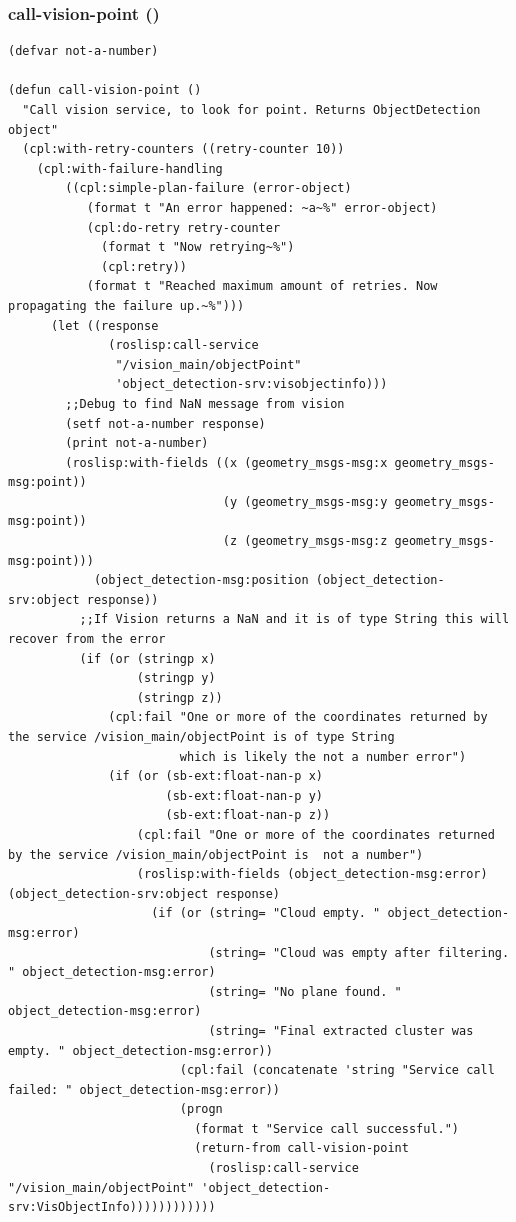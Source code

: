 \documentclass{suturo}
\begin{document}
\noindent
\begin{minipage}{\linewidth}
\subsubsection{call-vision-point ()}
\begin{lstlisting}
(defvar not-a-number)

(defun call-vision-point ()
  "Call vision service, to look for point. Returns ObjectDetection object"
  (cpl:with-retry-counters ((retry-counter 10))
    (cpl:with-failure-handling
        ((cpl:simple-plan-failure (error-object)
           (format t "An error happened: ~a~%" error-object)
           (cpl:do-retry retry-counter
             (format t "Now retrying~%")
             (cpl:retry))
           (format t "Reached maximum amount of retries. Now propagating the failure up.~%")))
      (let ((response
              (roslisp:call-service
               "/vision_main/objectPoint"
               'object_detection-srv:visobjectinfo)))
        ;;Debug to find NaN message from vision
        (setf not-a-number response)
        (print not-a-number)
        (roslisp:with-fields ((x (geometry_msgs-msg:x geometry_msgs-msg:point)) 
                              (y (geometry_msgs-msg:y geometry_msgs-msg:point))
                              (z (geometry_msgs-msg:z geometry_msgs-msg:point)))
            (object_detection-msg:position (object_detection-srv:object response))
          ;;If Vision returns a NaN and it is of type String this will recover from the error
          (if (or (stringp x)
                  (stringp y)
                  (stringp z))
              (cpl:fail "One or more of the coordinates returned by the service /vision_main/objectPoint is of type String
                        which is likely the not a number error")
              (if (or (sb-ext:float-nan-p x)
                      (sb-ext:float-nan-p y)
                      (sb-ext:float-nan-p z))
                  (cpl:fail "One or more of the coordinates returned by the service /vision_main/objectPoint is  not a number")
                  (roslisp:with-fields (object_detection-msg:error) (object_detection-srv:object response)
                    (if (or (string= "Cloud empty. " object_detection-msg:error)
                            (string= "Cloud was empty after filtering. " object_detection-msg:error)
                            (string= "No plane found. " object_detection-msg:error)
                            (string= "Final extracted cluster was empty. " object_detection-msg:error))
                        (cpl:fail (concatenate 'string "Service call failed: " object_detection-msg:error))
                        (progn
                          (format t "Service call successful.")
                          (return-from call-vision-point
                            (roslisp:call-service "/vision_main/objectPoint" 'object_detection-srv:VisObjectInfo))))))))))))
\end{lstlisting}
\end{minipage}
\end{document}
